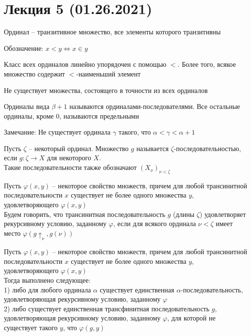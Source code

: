 \section{Лекция 5 (01.26.2021)}

\begin{defn}
 Ординал -- транзитивное множество, все элементы которого транзитивны
 \end{defn}

 Обозначение: $x < y \Leftrightarrow x \in y$

 \begin{theo}
 Класс всех ординалов линейно упорядочен с помощью $<$. Более того, всякое множество содержит $<$-наименьший элемент
 \end{theo}

 \begin{theo}
 Не существует множества, состоящего в точности из всех ординалов
 \end{theo}

\begin{defn}
Ординалы вида $\beta + 1$ называются ординалами-последователями. Все остальные ординалы, кроме $0$, называются предельными
\end{defn}

Замечание: Не существует ординала $\gamma$ такого, что $\alpha < \gamma < \alpha +1$

\begin{defn}
Пусть $\zeta$ -- некоторый ординал. Множество $g$ называется $\zeta$-последовательностью, если $g: \zeta \to X$ для некоторого $X$.\\
Такие последовательности также обозначают $(X_{\nu})_{\nu < \zeta}$
\end{defn}

\begin{defn}
Пусть $\varphi(x,y)$ -- некоторое свойство множеств, причем для любой трансинитной последовательности $x$ существует не более одного множества $y$, удовлетворяющего $\varphi(x,y)$\\
Будем говорить, что трансинитная последовательность $g$ (длины $\zeta$) удовлетворяет рекурсивному условию, заданному $\varphi$, если для всякого ординала $\nu < \zeta$ имеет место $\varphi(g \uparrow_{\nu}, g(\nu))$
\end{defn}

\begin{theo}
Пусть $\varphi(x,y)$ -- некоторое свойство множеств, причем для любой трансинитной последовательности $x$ существует не более одного множества $y$, удовлетворяющего $\varphi(x,y)$\\
Тогда выполнено следующее:\\
1) либо для любого ординала $\alpha$ существует единственная $\alpha$-последовательность, удовлетворяющая рекурсивному условию, заданному $\varphi$\\
2) либо существует единственная трансфинитная последовательность $g$, удовлетворяющая рекурсивному условию, заданному $\varphi$, для которой не существует такого $y$, что $\varphi(g,y)$
\end{theo}

